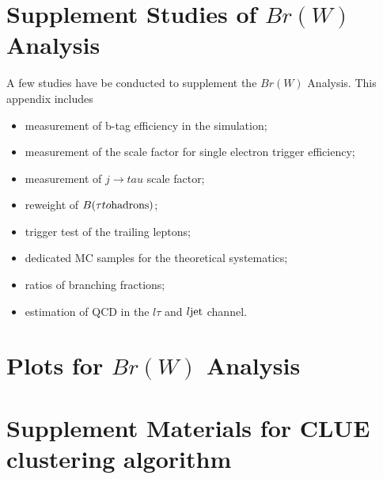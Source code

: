 \chapter{Supplement Studies of $Br(W)$ Analysis}

A few studies have be conducted to supplement the $Br(W)$ Analysis.
This appendix includes 
\begin{itemize}
    \item measurement of b-tag efficiency in the simulation;
    \item measurement of the scale factor for single electron trigger efficiency;
    \item measurement of $j \to tau$ scale factor;
    \item reweight of $B(\tau \to  \rm{hadrons})$;
    \item trigger test of the trailing leptons;
    \item dedicated MC samples for the \ttbar theoretical systematics;
    \item ratios of branching fractions;
    \item estimation of QCD in the $l\tau$ and $l\rm{jet}$ channel. 
\end{itemize}















\chapter{Plots for $Br(W)$ Analysis}
% 




\chapter{Supplement Materials for CLUE clustering algorithm}

